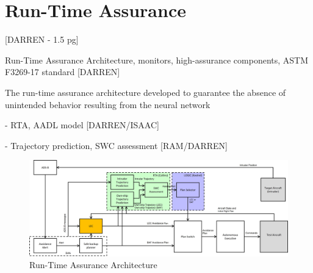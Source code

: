 \section{Run-Time Assurance}

[DARREN - 1.5 pg]

Run-Time Assurance Architecture, monitors, high-assurance components, ASTM F3269-17 standard [DARREN]

The run-time assurance architecture developed to guarantee the absence of unintended behavior resulting from the neural network

- RTA, AADL model [DARREN/ISAAC]

- Trajectory prediction, SWC assessment [RAM/DARREN]


\begin{figure}
	\centering
	\includegraphics[width=\textwidth]{figures/rta-arch.jpg}
	\caption{Run-Time Assurance Architecture}
	\label{fig:rta-arch}
\end{figure}